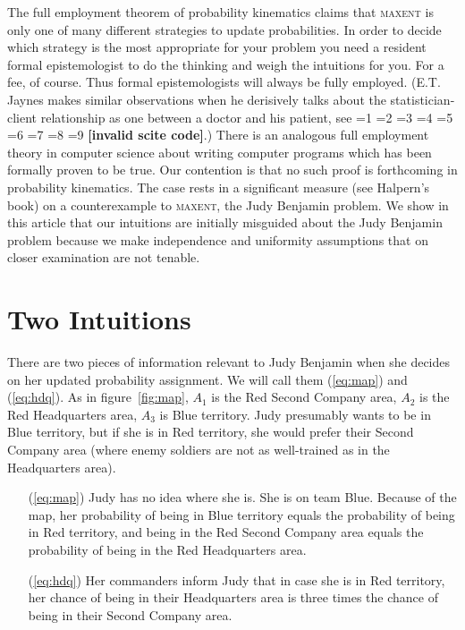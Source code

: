 \documentclass[smallextended]{svjour3}       %
\newcommand{\nias}{\noindent} %
\newcommand{\PageP}{p.~}
\newcommand{\PageP}{}
\newcommand{\scite}[3]{\ifnum#1=1\cite{#2}\else
\ifnum#1=2\cite[{\PageP}~#3]{#2}\else
\ifnum#1=3\cite[{\PageP}~#3]{#2}\else
\ifnum#1=4\cite{#2}\else
\ifnum#1=5\cite{#2}\else
\ifnum#1=6\cite[{\PageP}~#3]{#2}\else
\ifnum#1=7\cite{#2}\else
\ifnum#1=8\cite[{\PageP}~#3]{#2}\else
\ifnum#1=9\cite[{\PageP}~#3]{#2}\else
\textbf{[invalid scite code]}\fi\fi\fi\fi\fi\fi\fi\fi\fi}
\begin{document}
The full employment theorem of probability kinematics claims that
\textsc{maxent} is only one of many different strategies to update
probabilities. In order to decide which strategy is the most
appropriate for your problem you need a resident formal epistemologist
to do the thinking and weigh the intuitions for you. For a fee, of
course. Thus formal epistemologists will always be fully employed.
(E.T. Jaynes makes similar observations when he derisively talks about
the statistician-client relationship as one between a doctor and his
patient, see \scite{8}{jaynes98}{492 and 506}.) There is an analogous
full employment theory in computer science about writing computer
programs which has been formally proven to be true. Our contention is
that no such proof is forthcoming in probability kinematics. The case
rests in a significant measure (see Halpern's book) on a
counterexample to \textsc{maxent}, the Judy Benjamin problem. We show
in this article that our intuitions are initially misguided about the
Judy Benjamin problem because we make independence and uniformity
assumptions that on closer examination are not tenable.

\section{Two Intuitions}
\label{sec:2}

\nias There are two pieces of information relevant to Judy Benjamin
when she decides on her updated probability assignment. We will call
them ({\ref{eq:map}}) and ({\ref{eq:hdq}}). As in
figure~\ref{fig:map}, $A_{1}$ is the Red Second Company area, $A_{2}$ is
the Red Headquarters area, $A_{3}$ is Blue territory. Judy presumably
wants to be in Blue territory, but if she is in Red territory, she
would prefer their Second Company area (where enemy soldiers are not
as well-trained as in the Headquarters area).

\begin{enumerate}
\item[({\ref{eq:map}})] Judy has no idea where she is. She is on team Blue.
  Because of the map, her probability of being in Blue territory
  equals the probability of being in Red territory, and being in the Red
  Second Company area equals the probability of being in the Red
  Headquarters area.
\item[({\ref{eq:hdq}})] Her commanders inform Judy that in case she is in Red
  territory, her chance of being in their Headquarters area is three
  times the chance of being in their Second Company area.
\end{enumerate}
\end{document}
